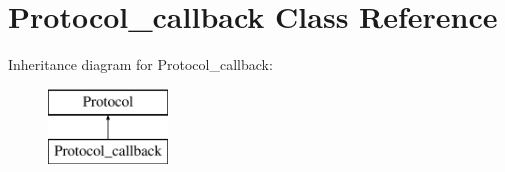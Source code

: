 \hypertarget{classProtocol__callback}{}\section{Protocol\+\_\+callback Class Reference}
\label{classProtocol__callback}
Inheritance diagram for Protocol\+\_\+callback\+:\begin{figure}[H]
\begin{center}
\leavevmode
\includegraphics[height=2.000000cm]{classProtocol__callback}
\end{center}
\end{figure}
